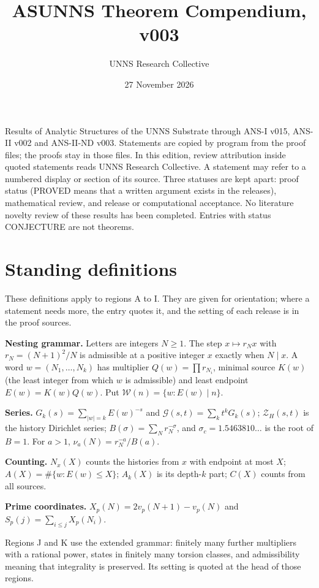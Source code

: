 \documentclass[
  11pt,
]{article}
\title{ASUNNS Theorem Compendium, v003}
\author{UNNS Research Collective}
\date{27 November 2026}
\begin{document}
\maketitle

{
\setcounter{tocdepth}{1}
\tableofcontents
}
Results of Analytic Structures of the UNNS Substrate through ANS-I v015,
ANS-II v002 and ANS-II-ND v003. Statements are copied by program from
the proof files; the proofs stay in those files. In this edition, review
attribution inside quoted statements reads UNNS Research Collective. A
statement may refer to a numbered display or section of its source.
Three statuses are kept apart: proof status (PROVED means that a written
argument exists in the releases), mathematical review, and release or
computational acceptance. No literature novelty review of these results
has been completed. Entries with status CONJECTURE are not theorems.

\hypertarget{standing-definitions}{%
\section{Standing definitions}\label{standing-definitions}}

These definitions apply to regions A to I. They are given for
orientation; where a statement needs more, the entry quotes it, and the
setting of each release is in the proof sources.

\textbf{Nesting grammar.} Letters are integers \(N\ge1\). The step
\(x\mapsto r_Nx\) with \(r_N=(N+1)^2/N\) is admissible at a positive
integer \(x\) exactly when \(N\mid x\). A word \(w=(N_1,\dots,N_k)\) has
multiplier \(Q(w)=\prod r_{N_i}\), minimal source \(K(w)\) (the least
integer from which \(w\) is admissible) and least endpoint
\(E(w)=K(w)Q(w)\). Put \(\mathcal W(n)=\{w:E(w)\mid n\}\).

\textbf{Series.} \(G_k(s)=\sum_{|w|=k}E(w)^{-s}\) and
\(\mathcal G(s,t)=\sum_kt^kG_k(s)\); \(\mathcal Z_H(s,t)\) is the
history Dirichlet series; \(B(\sigma)=\sum_Nr_N^{-\sigma}\), and
\(\sigma_c=1.5463810\ldots\) is the root of \(B=1\). For \(a>1\),
\(\nu_a(N)=r_N^{-a}/B(a)\).

\textbf{Counting.} \(N_x(X)\) counts the histories from \(x\) with
endpoint at most \(X\); \(A(X)=\#\{w:E(w)\le X\}\); \(A_k(X)\) is its
depth-\(k\) part; \(C(X)\) counts from all sources.

\textbf{Prime coordinates.} \(X_p(N)=2v_p(N+1)-v_p(N)\) and
\(S_p(j)=\sum_{i\le j}X_p(N_i)\).

Regions J and K use the extended grammar: finitely many further
multipliers with a rational power, states in finitely many torsion
classes, and admissibility meaning that integrality is preserved. Its
setting is quoted at the head of those regions.
\end{document}
